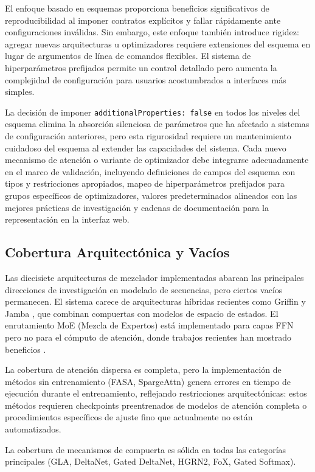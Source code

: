 \documentclass[11pt,a4paper]{article}
\begin{document}
El enfoque basado en esquemas proporciona beneficios significativos de reproducibilidad al imponer contratos explícitos y fallar rápidamente ante configuraciones inválidas. Sin embargo, este enfoque también introduce rigidez: agregar nuevas arquitecturas u optimizadores requiere extensiones del esquema en lugar de argumentos de línea de comandos flexibles. El sistema de hiperparámetros prefijados permite un control detallado pero aumenta la complejidad de configuración para usuarios acostumbrados a interfaces más simples.

La decisión de imponer \texttt{additionalProperties: false} en todos los niveles del esquema elimina la absorción silenciosa de parámetros que ha afectado a sistemas de configuración anteriores, pero esta rigurosidad requiere un mantenimiento cuidadoso del esquema al extender las capacidades del sistema. Cada nuevo mecanismo de atención o variante de optimizador debe integrarse adecuadamente en el marco de validación, incluyendo definiciones de campos del esquema con tipos y restricciones apropiados, mapeo de hiperparámetros prefijados para grupos específicos de optimizadores, valores predeterminados alineados con las mejores prácticas de investigación y cadenas de documentación para la representación en la interfaz web.

\subsection{Cobertura Arquitectónica y Vacíos}

Las diecisiete arquitecturas de mezclador implementadas abarcan las principales direcciones de investigación en modelado de secuencias, pero ciertos vacíos permanecen. El sistema carece de arquitecturas híbridas recientes como Griffin \citep{soares_griffin_2024} y Jamba \citep{gu_jamba_2024}, que combinan compuertas con modelos de espacio de estados. El enrutamiento MoE (Mezcla de Expertos) está implementado para capas FFN pero no para el cómputo de atención, donde trabajos recientes han mostrado beneficios \citep{lewis_moe_2021}.

La cobertura de atención dispersa es completa, pero la implementación de métodos sin entrenamiento (FASA, SpargeAttn) genera errores en tiempo de ejecución durante el entrenamiento, reflejando restricciones arquitectónicas: estos métodos requieren checkpoints preentrenados de modelos de atención completa o procedimientos específicos de ajuste fino que actualmente no están automatizados.

La cobertura de mecanismos de compuerta es sólida en todas las categorías principales (GLA, DeltaNet, Gated DeltaNet, HGRN2, FoX, Gated Softmax).
\end{document}

